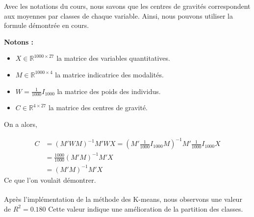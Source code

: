 \documentclass{article}
\begin{document}
Avec les notations du cours, nous savons que les centres de gravités correspondent aux moyennes par classes de chaque variable. Ainsi, nous pouvons utiliser la formule démontrée en cours.
\par\textbf{Notons :}
\begin{itemize}
    \item $X \in \mathbb{R}^{1000\times 27}$ la matrice des variables quantitatives.
    \item $M \in \mathbb{R}^{1000\times 4}$ la matrice indicatrice des modalités.
    \item $W = \frac{1}{1000} I_{1000}$ la matrice des poids des individus.
    \item $C \in \mathbb{R}^{4\times 27}$ la matrice des centres de gravité.
\end{itemize}

On a alors, 

\begin{align*}
    C &= (M'WM)^{-1}M'WX = (M'\frac{1}{1000} I_{1000} M)^{-1}M' \frac{1}{1000} I_{1000} X \\
    &=\frac{1000}{1000}(M'M)^{-1} M'X \\
    &= (M'M)^{-1} M'X
\end{align*}
Ce que l'on voulait démontrer.
\\
\\
Après l'implémentation de la méthode des K-means, nous observons une valeur de $R^2=0.180$ Cette valeur indique une amélioration de la partition des classes.
\end{document}
